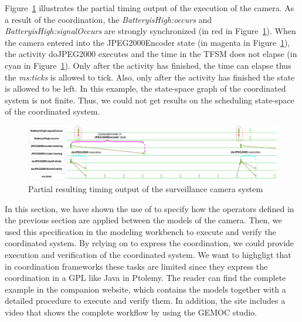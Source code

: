Figure~\ref{fig:camerasystem} illustrates the partial timing output of the execution of the camera. As a result of the coordination, the \mse \emph{BatteryisHigh:occurs} and \emph{BatteryisHigh:signalOccurs} are strongly synchronized (in red in Figure~\ref{fig:camerasystem}). When the camera entered into the JPEG2000Encoder state (in magenta in Figure~\ref{fig:camerasystem}), the activity doJPEG2000 executes and the time in the TFSM does not elapse (in cyan in Figure~\ref{fig:camerasystem}). Only after the activity has finished, the time can elapse thus the \mse \emph{ms:ticks} is allowed to tick. Also, only after the activity has finished the state is allowed to be left. In this example, the state-space graph of the coordinated system is not finite. Thus, we could not get results on the scheduling state-space of the coordinated system.
	
		\begin{figure}[h]
			\center
			\includegraphics[width=1\columnwidth]{examples/figs/vcdcamera}
			\caption{Partial resulting timing output of the surveillance camera system}
			\label{fig:camerasystem}
		\end{figure}
	
In this section, we have shown the use of \bflow to specify how the operators defined in the previous section are applied between the models of the camera. Then, we used this specification in the modeling workbench to execute and verify the coordinated system. By relying on \ccsl to express the coordination, we could provide execution and verification of the coordinated system. We want to highgligt that in coordination frameworks these tasks are limited since they express the coordination in a GPL like Java in Ptolemy. The reader can find the complete example in the companion website, which contains the models together with a detailed procedure to execute and verify them. In addition, the site includes a video that shows the complete workflow by using the GEMOC studio.


